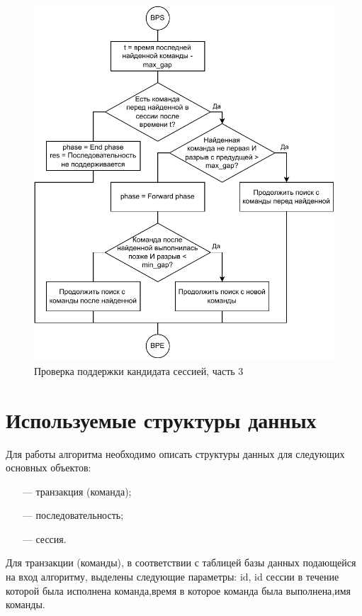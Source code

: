 \newpage
\begin{figure}[h!]
	\centering
	\includegraphics[width=1\textwidth]{inc/img/backward_phase.drawio.pdf}
	\caption{Проверка поддержки кандидата сессией, часть 3}
	\label{backward_phase}
\end{figure}

\newpage
\section{Используемые структуры данных}
Для работы алгоритма необходимо описать структуры данных для следующих основных объектов:
\begin{enumerate}
	\item[---] транзакция (команда);
	\item[---] последовательность;
	\item[---] сессия.
\end{enumerate}

Для транзакции (команды), в соответствии с таблицей базы данных подающейся на вход алгоритму, выделены следующие параметры:
id, id сессии в течение которой была исполнена команда,время в которое команда была выполнена,имя команды.

